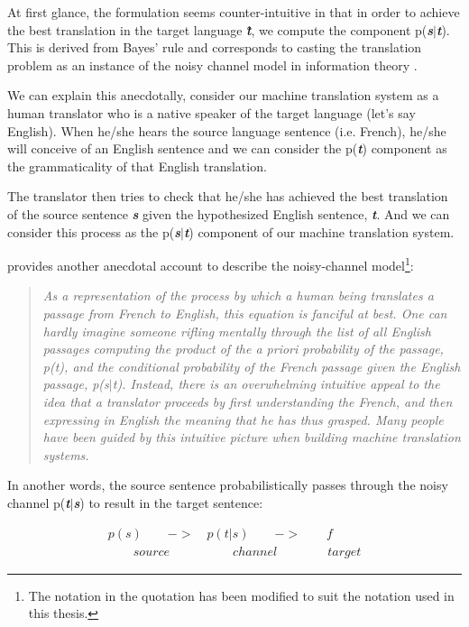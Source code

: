 At first glance, the formulation seems counter-intuitive in that in order to achieve the best translation in the target language \emph{\textbf{\^{t}}}, we compute the component p(\emph{\textbf{s}}${|}$\emph{\textbf{t}}). This is derived from Bayes' rule and corresponds to casting the translation problem as an instance of the noisy channel model in information theory \citep{shannon2001mathematical}.

We can explain this anecdotally, consider our machine translation system as a human translator who is a native speaker of the target language (let's say English). When he/she hears the source language sentence (i.e. French), he/she will conceive of an English sentence and we can consider the p(\emph{\textbf{t}}) component as the grammaticality of that English translation.

The translator then tries to check that he/she has achieved the best translation of the source sentence \emph{\textbf{s}} given the hypothesized English sentence, \emph{\textbf{t}}. And we can consider this process as the p(\emph{\textbf{s}}${|}$\emph{\textbf{t}}) component of our machine translation system.

\noindent \cite{brown1993mathematics} provides another anecdotal account to describe the noisy-channel model\footnote{The notation in the quotation has been modified to suit the notation used in this thesis.}:

\blockquote{\emph{As a representation of the process by which a human being translates a passage from French to English, this equation is fanciful at best. One can hardly imagine someone rifling mentally through the list of all English passages computing the product of the a priori probability of the passage, p(\emph{t}), and the conditional probability of the French passage given the English passage, p(\emph{s}${|}$\emph{t}). Instead, there is an overwhelming intuitive appeal to the idea that a translator proceeds by first understanding the French, and then expressing in English the meaning that he has thus grasped. Many people have been guided by this intuitive picture when building machine translation systems.}}

In another words, the source sentence probabilistically passes through the noisy channel  p(\emph{\textbf{t}}${|}$\emph{\textbf{s}}) to result in the target sentence:


\begin{equation}
\begin{aligned}
p(s)\quad \quad ->\quad p({ { t } }{ | }{ { s } })\quad \quad ->\quad \quad f\\ 
\quad \quad source\quad \quad \quad \quad \quad channel\quad \quad \quad \quad target
\end{aligned}
\end{equation}

